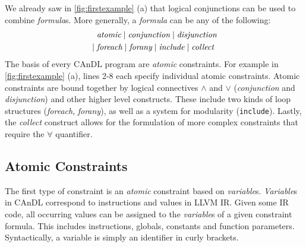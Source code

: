    We already saw in \autoref{fig:firstexample} (a) that logical conjunctions
    can be used to combine {\it formula}s.
    More generally, a {\it formula} can be any of the following:
    \begin{align*}
        &\text{\it atomic}\mid\text{\it conjunction}\mid \text{\it disjunction}\\
        \mid{}&{}\text{\it foreach}\mid \text{\it forany}\mid\text{\it include}\mid\text{\it collect}
    \end{align*}
    The basis of every CAnDL program are {\it atomic} constraints.
    For example in \autoref{fig:firstexample} (a), lines 2-8 each specify
    individual atomic constraints.
    Atomic constraints are bound together by logical connectives $\land$ and
    $\lor$ ({\it conjunction} and {\it disjunction}) and other higher level
    constructs.
    These include two kinds of loop structures ({\it foreach}, {\it forany}), as
    well as a system for modularity (\texttt{include}).
    Lastly, the {\it collect} construct allows for the formulation of more
    complex constraints that require the $\forall$ quantifier.

\subsection{Atomic Constraints}

    The first type of constraint is an {\it atomic} constraint based on
    {\it variable}s.
    {\it Variable}s in CAnDL correspond to instructions and values in LLVM IR. 
    Given some IR code, all occurring values can be assigned to the
    {\it variable}s of a given constraint formula.
    This includes instructions, globals, constants and function parameters.
    Syntactically, a variable is simply an identifier in curly brackets.

